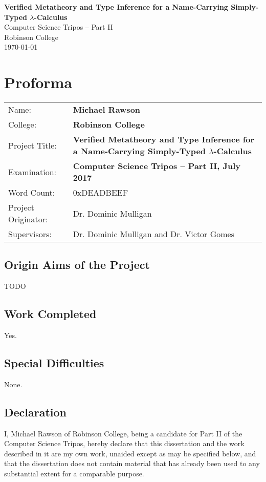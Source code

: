 \documentclass[12pt,a4paper,twoside,openright]{report}
\author{Michael Rawson}
\date{2016--17}
\newcommand{\thetitle}{Verified Metatheory and Type Inference for a Name-Carrying Simply-Typed \(\lambda\)-Calculus}
\begin{document}
\pagestyle{empty}
\vspace*{60mm}
\begin{center}
\Huge
\textbf{\thetitle}\\[5mm]
Computer Science Tripos -- Part II\\[5mm]
Robinson College\\[5mm]
\today
\end{center}

\pagestyle{plain}
\chapter*{Proforma}
{\large
\begin{tabular}{p{}p{}}
Name:              & \bf Michael Rawson\\
College:           & \bf Robinson College\\
Project Title:     & \bf \thetitle\\
Examination:       & \bf Computer Science Tripos -- Part II, July 2017\\
Word Count:        & 0xDEADBEEF\footnotemark[1]\\
Project Originator:& Dr. Dominic Mulligan\\
Supervisors:       & Dr. Dominic Mulligan and Dr. Victor Gomes\\
\end{tabular}
}

\section*{Origin Aims of the Project}
TODO

\section*{Work Completed}
Yes.

\section*{Special Difficulties}
None.

\newpage
\section*{Declaration}
I, Michael Rawson of Robinson College, being a candidate for Part II of the Computer Science Tripos, hereby declare that this dissertation and the work described in it are my own work, unaided except as may be specified below, and that the dissertation does not contain material that has already been used to any substantial extent for a comparable purpose.
\end{document}

